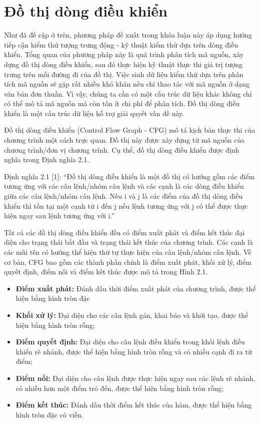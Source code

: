 \section{Đồ thị dòng điều khiển}

Như đã đề cập ở trên, phương pháp đề xuất trong khóa luận này áp dụng hướng tiếp
cận kiểm thử tượng trưng động - kỹ thuật kiểm thử dựa trên dòng điều khiển. Tổng quan
của phương pháp này là quá trình phân tích mã nguồn, xây dựng đồ thị dòng điều khiển,
sau đó thực hiện kỹ thuật thực thi giá trị tượng trưng trên mỗi đường đi của đồ thị. Việc
sinh dữ liệu kiểm thử dựa trên phân tích mã nguồn sẽ gặp rất nhiều khó khăn nếu chỉ
thao tác với mã nguồn ở dạng văn bản đơn thuần. Vì vậy, chúng ta cần có một cấu trúc
dữ liệu khác không chỉ có thể mô tả mã nguồn mà còn tốn ít chi phí để phân tích. Đồ thị
dòng điều khiển là một cấu trúc dữ liệu hỗ trợ giải quyết vấn đề này.

Đồ thị dòng điều khiển (Control Flow Graph - CFG) mô tả kịch bản thực thi của
chương trình một cách trực quan. Đồ thị này được xây dựng từ mã nguồn của chương trình/đơn vị chương trình. Cụ thể, đồ thị dòng điều khiển được định nghĩa trong Định
nghĩa 2.1.

Định nghĩa 2.1 [1]: “Đồ thị dòng điều khiển là một đồ thị có hướng gồm các điểm
tương ứng với các câu lệnh/nhóm câu lệnh và các cạnh là các dòng điều khiển giữa các
câu lệnh/nhóm câu lệnh. Nếu i và j là các điểm của đồ thị dòng điều khiển thì tồn tại
một cạnh từ i đến j nếu lệnh tương ứng với j có thể được thực hiện ngay sau lệnh tương
ứng với i.”

Tất cả các đồ thị dòng điều khiển đều có điểm xuất phát và điểm kết thúc đại diện
cho trạng thái bắt đầu và trạng thái kết thúc của chương trình. Các cạnh là các mũi tên có
hướng thể hiện thứ tự thực hiện của câu lệnh/nhóm câu lệnh. Về cơ bản, CFG bao gồm
các thành phần chính là điểm xuất phát, khối xử lý, điểm quyết định, điểm nối và điểm
kết thúc được mô tả trong Hình 2.1.

\begin{itemize}
  \item \textbf{Điểm xuất phát:} Đánh dấu thời điểm xuất phát của chương trình, được thể hiện bằng
  hình tròn đặc
  \item \textbf{Khối xử lý:} Đại diện cho các câu lệnh gán, khai báo và khởi tạo, được thể hiện bằng
  hình tròn rỗng;
  \item \textbf{Điểm quyết định:} Đại diện cho câu lệnh điều khiển trong khối lệnh điều khiển rẽ
  nhánh, được thể hiện bằng hình tròn rỗng và có nhiều cạnh đi ra từ điểm;
  \item \textbf{Điểm nối:} Đại diện cho câu lệnh được thực hiện ngay sau các lệnh rẽ nhánh, có
  nhiều hơn một điểm trỏ đến, được thể hiện bằng hình tròn rỗng;
  \item \textbf{Điểm kết thúc:} Đánh dấu thời điểm kết thúc của hàm, được thể hiện bằng hình tròn
  đặc có viền.
\end{itemize}

